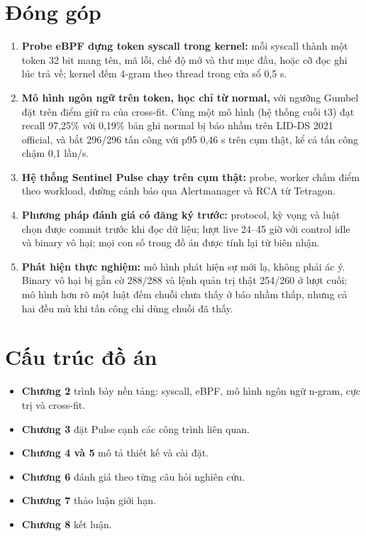 \section{Đóng góp}

\begin{enumerate}
\def\labelenumi{\arabic{enumi}.}
\tightlist
\item
  \textbf{Probe eBPF dựng token syscall trong kernel:} mỗi syscall thành một token 32 bit mang tên, mã lỗi, chế độ mở và thư mục đầu, hoặc cỡ đọc ghi lúc trả về; kernel đếm 4-gram theo thread trong cửa sổ 0,5 s.
\item
  \textbf{Mô hình ngôn ngữ trên token, học chỉ từ normal,} với ngưỡng Gumbel đặt trên điểm giữ ra của cross-fit. Cùng một mô hình (hệ thống cuối t3) đạt recall 97,25\% với 0,19\% bản ghi normal bị báo nhầm trên LID-DS 2021 official, và bắt 296/296 tấn công với p95 0,46 s trên cụm thật, kể cả tấn công chậm 0,1 lần/s.
\item
  \textbf{Hệ thống Sentinel Pulse chạy trên cụm thật:} probe, worker chấm điểm theo workload, đường cảnh báo qua Alertmanager và RCA từ Tetragon.
\item
  \textbf{Phương pháp đánh giá có đăng ký trước:} protocol, kỳ vọng và luật chọn được commit trước khi đọc dữ liệu; lượt live 24--45 giờ với control idle và binary vô hại; mọi con số trong đồ án được tính lại từ biên nhận.
\item
  \textbf{Phát hiện thực nghiệm:} mô hình phát hiện sự mới lạ, không phải ác ý. Binary vô hại bị gắn cờ 288/288 và lệnh quản trị thật 254/260 ở lượt cuối; mô hình hơn rõ một luật đếm chuỗi chưa thấy ở báo nhầm thấp, nhưng cả hai đều mù khi tấn công chỉ dùng chuỗi đã thấy.
\end{enumerate}

\section{Cấu trúc đồ án}

\begin{itemize}
\tightlist
\item
  \textbf{Chương 2} trình bày nền tảng: syscall, eBPF, mô hình ngôn ngữ n-gram, cực trị và cross-fit.
\item
  \textbf{Chương 3} đặt Pulse cạnh các công trình liên quan.
\item
  \textbf{Chương 4 và 5} mô tả thiết kế và cài đặt.
\item
  \textbf{Chương 6} đánh giá theo từng câu hỏi nghiên cứu.
\item
  \textbf{Chương 7} thảo luận giới hạn.
\item
  \textbf{Chương 8} kết luận.
\end{itemize}
